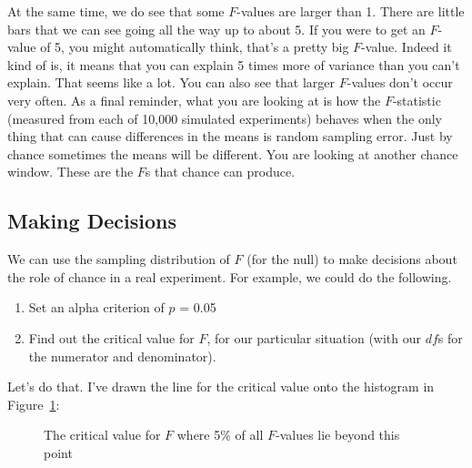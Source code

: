 \documentclass[
  letterpaper,
  DIV=11,
  numbers=noendperiod]{scrreprt}
\providecommand{\tightlist}{%
  \setlength{\itemsep}{0pt}\setlength{\parskip}{0pt}}\usepackage{longtable,booktabs,array}
\begin{document}
At the same time, we do see that some \(F\)-values are larger than 1.
There are little bars that we can see going all the way up to about 5.
If you were to get an \(F\)-value of 5, you might automatically think,
that's a pretty big \(F\)-value. Indeed it kind of is, it means that you
can explain 5 times more of variance than you can't explain. That seems
like a lot. You can also see that larger \(F\)-values don't occur very
often. As a final reminder, what you are looking at is how the
\(F\)-statistic (measured from each of 10,000 simulated experiments)
behaves when the only thing that can cause differences in the means is
random sampling error. Just by chance sometimes the means will be
different. You are looking at another chance window. These are the
\(F\)s that chance can produce.

\subsection{Making Decisions}\label{making-decisions}

We can use the sampling distribution of \(F\) (for the null) to make
decisions about the role of chance in a real experiment. For example, we
could do the following.

\begin{enumerate}
\def\labelenumi{\arabic{enumi}.}
\tightlist
\item
  Set an alpha criterion of \(p\) = 0.05
\item
  Find out the critical value for \(F\), for our particular situation
  (with our \(df\)s for the numerator and denominator).
\end{enumerate}

Let's do that. I've drawn the line for the critical value onto the
histogram in Figure~\ref{fig-8criticalF}:

\begin{figure}


\caption{\label{fig-8criticalF}The critical value for \(F\) where 5\% of
all \(F\)-values lie beyond this point}

\end{figure}%
\end{document}
